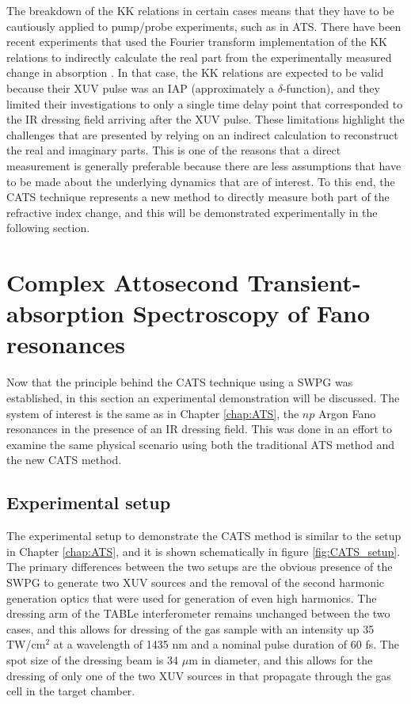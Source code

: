 The breakdown of the KK relations in certain cases means that they have to be cautiously applied to pump/probe experiments, such as in ATS.  There have been recent experiments that used the Fourier transform implementation of the KK relations \cite{petersonCausalityCalculationsTime1973} to indirectly calculate the real part from the experimentally measured change in absorption \cite{stoossRealTimeReconstructionStrongFieldDriven2018}.  In that case, the KK relations are expected to be valid because their XUV pulse was an IAP (approximately a $\delta$-function), and they limited their investigations to only a single time delay point that corresponded to the IR dressing field arriving after the XUV pulse.  These limitations highlight the challenges that are presented by relying on an indirect calculation to reconstruct the real and imaginary parts.  This is one of the reasons that a direct measurement is generally preferable because there are less assumptions that have to be made about the underlying dynamics that are of interest.  To this end, the CATS technique represents a new method to directly measure both part of the refractive index change, and this will be demonstrated experimentally in the following section.




\section{Complex Attosecond Transient-absorption Spectroscopy of Fano resonances}
\label{sec:CATS_ar}

Now that the principle behind the CATS technique using a SWPG was established, in this section an experimental demonstration will be discussed.  The system of interest is the same as in Chapter \ref{chap:ATS}, the $np$ Argon Fano resonances in the presence of an IR dressing field. This was done in an effort to examine the same physical scenario using both the traditional ATS method and the new CATS method.

\subsection{Experimental setup}
\label{sec:CATS_ar_exp_setup}

The experimental setup to demonstrate the CATS method is similar to the setup in Chapter \ref{chap:ATS}, and it is shown schematically in figure \ref{fig:CATS_setup}.  The primary differences between the two setups are the obvious presence of the SWPG to generate two XUV sources and the removal of the second harmonic generation optics that were used for generation of even high harmonics.  The dressing arm of the TABLe interferometer remains unchanged between the two cases, and this allows for dressing of the gas sample with an intensity up 35 TW/cm$^2$ at a wavelength of 1435 nm and a nominal pulse duration of 60 fs. The spot size of the dressing beam is 34 $\mu$m in diameter, and this allows for the dressing of only one of the two XUV sources in that propagate through the gas cell in the target chamber.

